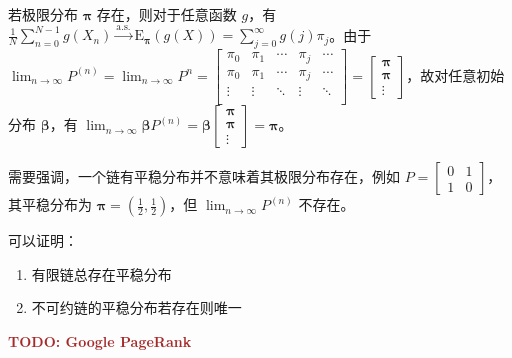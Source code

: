 \documentclass[../main.tex]{subfiles}
\begin{document}
若极限分布 $\boldsymbol\pi$ 存在，则对于任意函数 $g$，有 $\frac1N\sum_{n=0}^{N-1}g(X_n)\overset{\mathrm{a.s.}}\rightarrow\mathrm E_{\boldsymbol\pi}(g(X))=\sum_{j=0}^\infty g(j)\pi_j$。由于 $\lim_{n\rightarrow\infty}P^{(n)}=\lim_{n\rightarrow\infty}P^n=
    \left[\begin{matrix}
            \pi_0  & \pi_1  & \cdots & \pi_j  & \cdots \\
            \pi_0  & \pi_1  & \cdots & \pi_j  & \cdots \\
            \vdots & \vdots & \ddots & \vdots & \ddots \\
        \end{matrix}\right]=
    \left[\begin{matrix}
            \boldsymbol\pi \\
            \boldsymbol\pi \\
            \vdots
        \end{matrix}\right]$，故对任意初始分布 $\boldsymbol\beta$，有 $\lim_{n\rightarrow\infty}\boldsymbol\beta P^{(n)}=\boldsymbol\beta\left[\begin{matrix}
            \boldsymbol\pi \\
            \boldsymbol\pi \\
            \vdots
        \end{matrix}\right]=\boldsymbol\pi$。

需要强调，一个链有平稳分布并不意味着其极限分布存在，例如 $P=
    \left[\begin{matrix}
            0 & 1 \\
            1 & 0
        \end{matrix}\right]$，其平稳分布为 $\boldsymbol\pi=(\frac12,\frac12)$，但 $\lim_{n\rightarrow\infty}P^{(n)}$ 不存在。

可以证明：
\begin{enumerate}
    \item 有限链总存在平稳分布
    \item 不可约链的平稳分布若存在则唯一
\end{enumerate}

\begin{example}
    \textbf{\textcolor{brown}{TODO: Google PageRank}}
\end{example}
\end{document}
